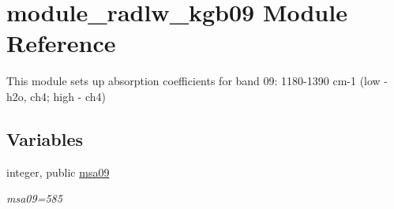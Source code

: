 \hypertarget{namespacemodule__radlw__kgb09}{}\section{module\+\_\+radlw\+\_\+kgb09 Module Reference}
\label{namespacemodule__radlw__kgb09}


This module sets up absorption coefficients for band 09\+: 1180-\/1390 cm-\/1 (low -\/ h2o, ch4; high -\/ ch4)  


\subsection*{Variables}
\begin{DoxyCompactItemize}
\item 
\mbox{\label{namespacemodule__radlw__kgb09_ab739f0acab23f3140067506b396b3717}} 
integer, public \hyperlink{namespacemodule__radlw__kgb09_ab739f0acab23f3140067506b396b3717}{msa09}
\begin{DoxyCompactList}\small\item\em msa09=585 \end{DoxyCompactList}\end{DoxyCompactItemize}
